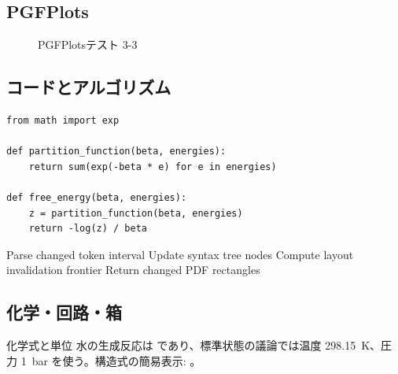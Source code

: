 \documentclass[12pt,a4paper,openany]{ltjsbook}
\theoremstyle{definition}
\theoremstyle{plain}
\theoremstyle{remark}
\begin{document}
\subsection{PGFPlots}
\begin{figure}[H]
\centering
{}
\caption{PGFPlotsテスト 3-3}\label{fig:pgfplots-3-3}
\end{figure}

\subsection{コードとアルゴリズム}
\begin{lstlisting}[style=pythonstyle,caption={Python風擬似コード 3-3}]
from math import exp

def partition_function(beta, energies):
    return sum(exp(-beta * e) for e in energies)

def free_energy(beta, energies):
    z = partition_function(beta, energies)
    return -log(z) / beta
\end{lstlisting}

\begin{algorithm}[H]
\caption{差分プレビュー更新アルゴリズム 3-3}
Parse changed token interval\;
Update syntax tree nodes\;
Compute layout invalidation frontier\;
Return changed PDF rectangles\;
\end{algorithm}

\subsection{化学・回路・箱}
\begin{greenbox}{化学式と単位}
水の生成反応は  であり、標準状態の議論では温度 \SI{298.15}{\kelvin}、圧力 \SI{1}{\bar} を使う。構造式の簡易表示: 。
\end{greenbox}
\end{document}
